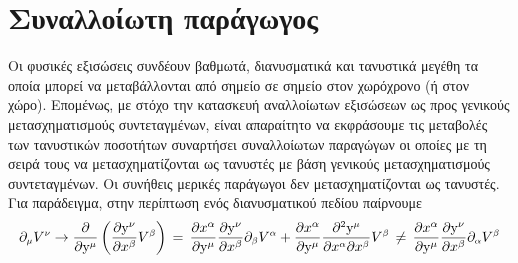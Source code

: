 \section{Συναλλοίωτη παράγωγος}
Οι φυσικές εξισώσεις συνδέουν βαθμωτά, διανυσματικά και τανυστικά μεγέθη τα οποία μπορεί να μεταβάλλονται από σημείο σε σημείο στον χωρόχρονο (ή στον χώρο). 
Επομένως, με στόχο την κατασκευή αναλλοίωτων εξισώσεων ως προς γενικούς μετασχηματισμούς συντεταγμένων, 
είναι απαραίτητο να εκφράσουμε τις μεταβολές των τανυστικών ποσοτήτων συναρτήσει συναλλοίωτων παραγώγων οι οποίες με τη σειρά τους να μετασχηματίζονται ως τανυστές με βάση γενικούς μετασχηματισμούς συντεταγμένων. 
Οι συνήθεις μερικές παράγωγοι δεν μετασχηματίζονται ως τανυστές. Για παράδειγμα, στην περίπτωση ενός διανυσματικού πεδίου παίρνουμε
\begin{equation}\label{pdertrans}
    \partial\subscr{\mu}V\superscr{\nu}\rightarrow\pd{}{\y\superscr{\mu}}\left( \L{\nu}{\beta}V\superscr{\beta} \right) \,=\, \L[i]{\alpha}{\mu}\L{\nu}{\beta}\partial\subscr{\beta}V\superscr{\alpha} + \L[i]{\alpha}{\mu}\spd{\y\superscr{\mu}}{x\superscr{\alpha}}{x\superscr{\beta}}V\superscr{\beta} \,\neq\, \L[i]{\alpha}{\mu}\L{\nu}{\beta} \partial\subscr{\alpha}V\superscr{\beta}
\end{equation}
\\

